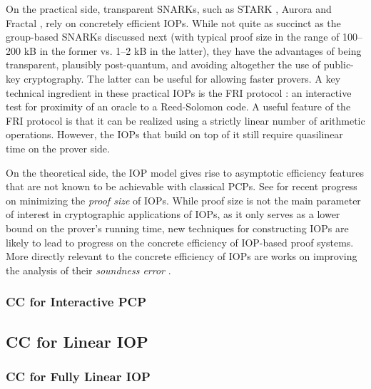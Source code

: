 On the practical side, transparent SNARKs, such as STARK \cite{2018:BBHR:STARK}, Aurora \cite{2018:CRSVW:aurora} and Fractal \cite{2020:COS:Fractal}, rely on concretely efficient IOPs.
While not quite as succinct as the group-based SNARKs discussed next (with typical proof size in the range of 100--200 kB in the former vs. 1--2 kB in the latter), they have the advantages of being transparent, plausibly post-quantum, and avoiding altogether the use of public-key cryptography.
The latter can be useful for allowing faster provers.
A key technical ingredient in these practical IOPs is the FRI protocol \cite{2018:BBHR:FRI}: an interactive test for proximity of an oracle to a Reed-Solomon code.
A useful feature of the FRI protocol is that it can be realized using a strictly linear number of arithmetic operations.
However, the IOPs that build on top of it still require quasilinear time on the prover side. 


On the theoretical side, the IOP model gives rise to asymptotic efficiency features that are not known to be achievable with classical PCPs.
See \cite{2019:BCGGRS:linear-size,2020:RR:local-proofs} for recent progress on minimizing the {\em proof size} of IOPs.
While proof size is not the main parameter of interest in cryptographic applications of IOPs, as it only serves as a lower bound on the prover's running time, new techniques for constructing IOPs are likely to lead to progress on the concrete efficiency of IOP-based proof systems.
More directly relevant to the concrete efficiency of IOPs are works on improving the analysis of their {\em soundness error}
\cite{2018:BKSS:worst-case,2020:BGKS:DEEP-FRI,2020:BCIKS:proximity-gaps}.


\subsubsection{CC for Interactive PCP}
\label{sec:CC-PCP:interactive-PCP}

\WANTED[]


\subsection{CC for Linear IOP}
\label{sec:CC-LIOP}



\subsubsection{CC for Fully Linear  IOP}
\label{sec:CC-LIOP:fully-linear}

